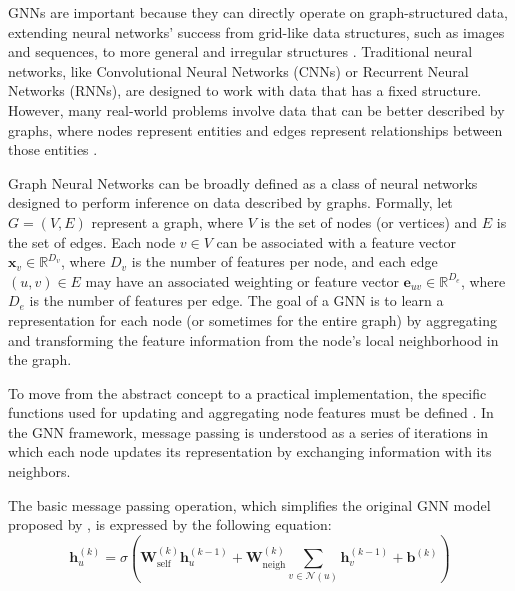 GNNs are important because they can directly operate on graph-structured data, extending neural networks' success from grid-like data structures, such as images and sequences, to more general and irregular structures \cite{Jia_Wang_Shou_Hosseini_Bai_2023a} . Traditional neural networks, like Convolutional Neural Networks (CNNs) or Recurrent Neural Networks (RNNs), are designed to work with data that has a fixed structure. However, many real-world problems involve data that can be better described by graphs, where nodes represent entities and edges represent relationships between those entities \cite{Gupta_Matta_Pant_2021}. 


Graph Neural Networks can be broadly defined as a class of neural networks designed to perform inference on data described by graphs. Formally, let \( G = (V, E) \) represent a graph, where \( V \) is the set of nodes (or vertices) and \( E \) is the set of edges. Each node \( v \in V \) can be associated with a feature vector \( \mathbf{x}_v \in \mathbb{R}^{D_v} \), where \( D_v \) is the number of features per node, and each edge \( (u, v) \in E \) may have an associated weighting or feature vector \( \mathbf{e}_{uv} \in \mathbb{R}^{D_e} \), where \( D_e \) is the number of features per edge. The goal of a GNN is to learn a representation for each node (or sometimes for the entire graph) by aggregating and transforming the feature information from the node's local neighborhood in the graph.


To move from the abstract concept to a practical implementation, the specific functions used for updating and aggregating node features must be defined \cite{Liu_Wu_Liu_Hu_2021}. In the GNN framework, message passing is understood as a series of iterations in which each node updates its representation by exchanging information with its neighbors. 

The basic message passing operation, which simplifies the original GNN model proposed by \cite{GRLB_Hamilton}, is expressed by the following equation:
\begin{equation}
 \mathbf{h}_u^{(k)} = \sigma\left( \mathbf{W}_{\text{self}}^{(k)} \mathbf{h}_u^{(k-1)} + \mathbf{W}_{\text{neigh}}^{(k)} \sum_{v \in \mathcal{N}(u)} \mathbf{h}_v^{(k-1)} + \mathbf{b}^{(k)} \right)  
    \label{eq:message_passing}
\end{equation}


